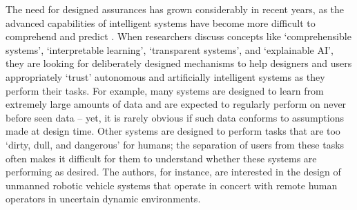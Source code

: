 

    The need for designed assurances has grown considerably in recent years, as the advanced capabilities of intelligent systems have become more difficult to comprehend and predict \cite{Doshi-Velez2017-xy, Weller2017-zx, Lipton2016-ug, Gunning2017-ih}. 
    When researchers discuss concepts like `comprehensible systems', `interpretable learning', `transparent systems', and `explainable AI', they are looking for deliberately designed mechanisms to help designers and users appropriately `trust' autonomous and artificially intelligent systems as they perform their tasks. 
    For example, many systems are designed to learn from extremely large amounts of data and are expected to regularly perform on never before seen data -- yet, it is rarely obvious if such data conforms to assumptions made at design time. 
    Other systems are designed to perform tasks that are too `dirty, dull, and dangerous' for humans; the separation of users from these tasks often makes it difficult for them to understand whether these systems are performing as desired. 
    The authors, for instance, are interested in the design of unmanned robotic vehicle systems that operate in concert with remote human operators in uncertain dynamic environments. 
